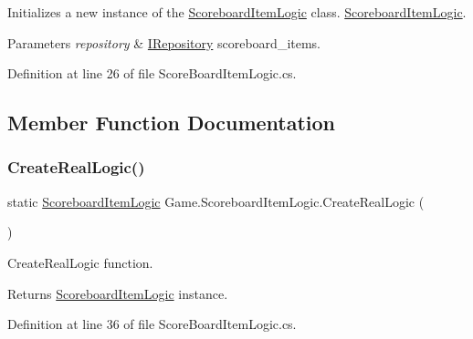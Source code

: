 Initializes a new instance of the \mbox{\hyperlink{class_game_1_1_scoreboard_item_logic}{Scoreboard\+Item\+Logic}} class. \mbox{\hyperlink{class_game_1_1_scoreboard_item_logic}{Scoreboard\+Item\+Logic}}. 


\begin{DoxyParams}{Parameters}
{\em repository} & \mbox{\hyperlink{interface_game_1_1_i_repository}{I\+Repository}} scoreboard\+\_\+items.\\
\hline
\end{DoxyParams}


Definition at line 26 of file Score\+Board\+Item\+Logic.\+cs.



\subsection{Member Function Documentation}
\mbox{\label{class_game_1_1_scoreboard_item_logic_a92667ef5e19216241aec97a9e05db5cf}} 
\subsubsection{\texorpdfstring{CreateRealLogic()}{CreateRealLogic()}}
{\footnotesize\ttfamily static \mbox{\hyperlink{class_game_1_1_scoreboard_item_logic}{Scoreboard\+Item\+Logic}} Game.\+Scoreboard\+Item\+Logic.\+Create\+Real\+Logic (\begin{DoxyParamCaption}{ }\end{DoxyParamCaption})\hspace{0.3cm}{\ttfamily [static]}}



Create\+Real\+Logic function. 

\begin{DoxyReturn}{Returns}
\mbox{\hyperlink{class_game_1_1_scoreboard_item_logic}{Scoreboard\+Item\+Logic}} instance.
\end{DoxyReturn}


Definition at line 36 of file Score\+Board\+Item\+Logic.\+cs.

\mbox{\label{class_game_1_1_scoreboard_item_logic_a4f2a4393bc1bdfaac69ce0481def5d4a}} 
